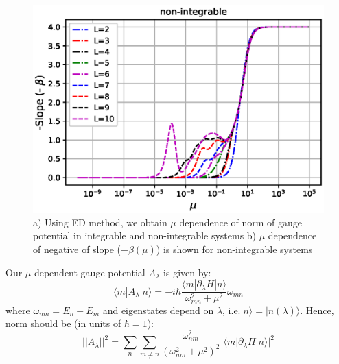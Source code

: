 \documentclass[11pt,a4paper]{article}
\begin{document}
\begin{figure}[!ht]
\begin{center}
\includegraphics[scale=0.43]{new_pics/slope_small_system_nonint.eps}
\caption{a) Using ED method, we obtain  $\mu$ dependence of norm of gauge potential in integrable and non-integrable systems b) $\mu$ dependence of negative of slope ($-\beta (\mu)$) is shown for non-integrable systems}
\end{center}
\end{figure}


Our $\mu$-dependent gauge potential $A_{\lambda}$ is given by:
\begin{equation}
\langle m |A_{\lambda} | n \rangle =  -i \hbar \dfrac{\langle m |\partial_{\lambda}H | n \rangle}{\omega_{mn}^2+ \mu^2} \omega_{mn}
\end{equation}
where $\omega_{nm}=E_n-E_m$ and eigenstates depend on $\lambda$, i.e.$|n \rangle= |n (\lambda) \rangle $. Hence, norm should be (in units of $\hbar=1$):
\begin{equation}
||A_{\lambda}||^2 = \sum_n \sum_{m \neq n}  \dfrac{\omega_{nm}^2}{(\omega_{nm}^2 + \mu^2)^2} |\langle m | \partial_{\lambda}H| n \rangle|^2
\end{equation}
\end{document}
